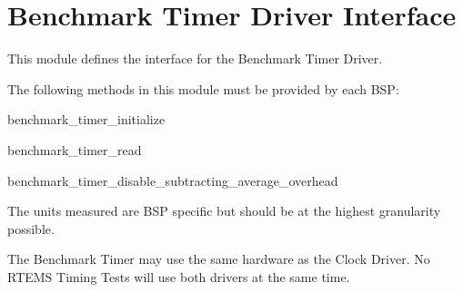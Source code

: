 \hypertarget{group__BenchmarkTimer}{}\section{Benchmark Timer Driver Interface}
\label{group__BenchmarkTimer}
This module defines the interface for the Benchmark Timer Driver.

The following methods in this module must be provided by each B\+SP\+:


\begin{DoxyItemize}
\item benchmark\+\_\+timer\+\_\+initialize
\item benchmark\+\_\+timer\+\_\+read
\item benchmark\+\_\+timer\+\_\+disable\+\_\+subtracting\+\_\+average\+\_\+overhead
\end{DoxyItemize}

The units measured are B\+SP specific but should be at the highest granularity possible.

The Benchmark Timer may use the same hardware as the Clock Driver. No R\+T\+E\+MS Timing Tests will use both drivers at the same time. 